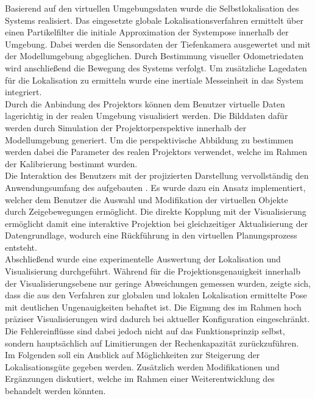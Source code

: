 Basierend auf den virtuellen Umgebungsdaten wurde die Selbstlokalisation des Systems realisiert. Das eingesetzte globale Lokalisationsverfahren ermittelt über einen Partikelfilter die initiale Approximation der Systempose innerhalb der Umgebung. Dabei werden die Sensordaten der Tiefenkamera ausgewertet und mit der Modellumgebung abgeglichen. Durch Bestimmung visueller Odometriedaten wird anschließend die Bewegung des Systems verfolgt. Um zusätzliche Lagedaten für die Lokalisation zu ermitteln wurde eine inertiale Messeinheit in das System integriert.\\

Durch die Anbindung des Projektors können dem Benutzer virtuelle Daten lagerichtig in der realen Umgebung visualisiert werden. Die Bilddaten dafür werden durch Simulation der Projektorperspektive innerhalb der Modellumgebung generiert. Um die perspektivische Abbildung zu bestimmen werden dabei die Parameter des realen Projektors verwendet, welche im Rahmen der Kalibrierung bestimmt wurden.\\

Die Interaktion des Benutzers mit der projizierten Darstellung vervollständig den Anwendungsumfang des aufgebauten . Es wurde dazu ein Ansatz implementiert, welcher dem Benutzer die Auswahl und Modifikation der virtuellen Objekte durch Zeigebewegungen ermöglicht. Die direkte Kopplung mit der Visualisierung ermöglicht damit eine interaktive Projektion bei gleichzeitiger Aktualisierung der Datengrundlage, wodurch eine Rückführung in den virtuellen Planungsprozess entsteht.\\

Abschließend wurde eine experimentelle Auswertung der Lokalisation und Visualisierung durchgeführt. Während für die Projektionsgenauigkeit innerhalb der Visualisierungsebene nur geringe Abweichungen gemessen wurden, zeigte sich, dass die aus den Verfahren zur globalen und lokalen Lokalisation ermittelte Pose mit deutlichen Ungenauigkeiten behaftet ist. Die Eignung des  im Rahmen hoch präziser Visualisierungen wird dadurch bei aktueller Konfiguration eingeschränkt. Die Fehlereinflüsse sind dabei jedoch nicht auf das Funktionsprinzip selbst, sondern hauptsächlich auf Limitierungen der Rechenkapazität zurückzuführen.\\
Im Folgenden soll ein Ausblick auf Möglichkeiten zur Steigerung der Lokalisationsgüte gegeben werden. Zusätzlich werden Modifikationen und Ergänzungen diskutiert, welche im Rahmen einer Weiterentwicklung des  behandelt werden könnten.\\

